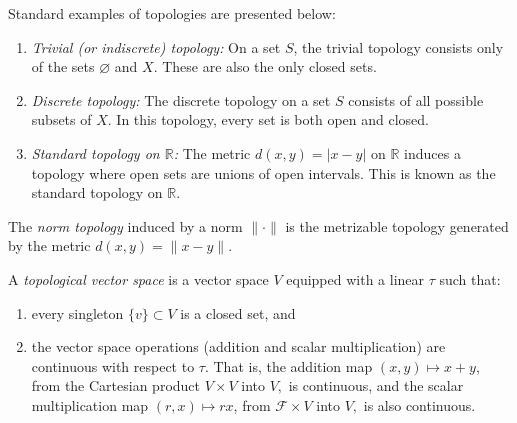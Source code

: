\begin{example}
Standard examples of topologies are presented below:
\begin{enumerate}
    \item \emph{Trivial (or indiscrete) topology:} On a set $S$, the trivial topology consists only of the sets $\varnothing$ and $X$. These are also the only closed sets.
    
    \item \emph{Discrete topology:} The discrete topology on a set $S$ consists of all possible subsets of $X$. In this topology, every set is both open and closed.
    
    \item \emph{Standard topology on $\mathbb{R}$:} The metric $d(x, y) = |x - y|$ on $\mathbb{R}$ induces a topology where open sets are unions of open intervals. This is known as the standard topology on $\mathbb{R}$.
\end{enumerate}
\end{example}

\begin{definition}
  The \emph{norm topology} induced by a norm $\|\cdot\|$ is the metrizable topology generated by the metric $d(x, y) = \|x - y\|$.
\end{definition}


\begin{definition}
A \emph{topological vector space} is a vector space \( V \) equipped with a linear \( \tau \) such that:
\begin{enumerate}
    \item every singleton \( \{v\} \subset V \) is a closed set, and
    \item the vector space operations (addition and scalar multiplication) are continuous with respect to \( \tau \).  That is, the addition map \( (x, y) \mapsto x + y \), from the Cartesian product \( V \times V \) into \( V, \) is continuous, and the scalar multiplication map \( (r, x) \mapsto r x \), from \( \mathcal{F} \times V \) into \( V, \) is also continuous.
\end{enumerate}

\end{definition}

